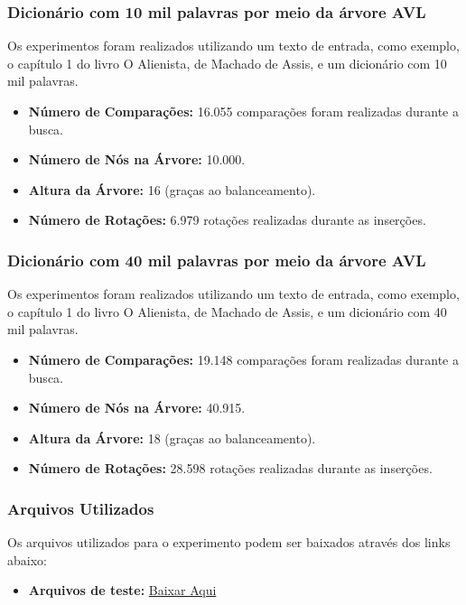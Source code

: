 \documentclass[a4paper, 12pt, english]{article}
\begin{document}
\newpage

\subsubsection{Dicionário com 10 mil palavras por meio da árvore AVL}
Os experimentos foram realizados utilizando um texto de entrada, como exemplo, o capítulo 1 do livro O Alienista, de Machado de Assis, e um dicionário com 10 mil palavras.

\begin{itemize}
    \item \textbf{Número de Comparações:} 16.055 comparações foram realizadas durante a busca.
    \item \textbf{Número de Nós na Árvore:} 10.000.
    \item \textbf{Altura da Árvore:} 16 (graças ao balanceamento).
    \item \textbf{Número de Rotações:} 6.979 rotações realizadas durante as inserções.
\end{itemize}

\subsubsection{Dicionário com 40 mil palavras por meio da árvore AVL}
Os experimentos foram realizados utilizando um texto de entrada, como exemplo, o capítulo 1 do livro O Alienista, de Machado de Assis, e um dicionário com 40 mil palavras.

\begin{itemize}
    \item \textbf{Número de Comparações:} 19.148 comparações foram realizadas durante a busca.
    \item \textbf{Número de Nós na Árvore:} 40.915.
    \item \textbf{Altura da Árvore:} 18 (graças ao balanceamento).
    \item \textbf{Número de Rotações:} 28.598 rotações realizadas durante as inserções.
\end{itemize}

\subsubsection{Arquivos Utilizados}
Os arquivos utilizados para o experimento podem ser baixados através dos links abaixo:
\begin{itemize}
    \item \textbf{Arquivos de teste:} \href{https://moodle.ufrgs.br/pluginfile.php/7039297/course/section/4279465/arqs_teste.zip}{Baixar Aqui}
\end{itemize}
\end{document}
